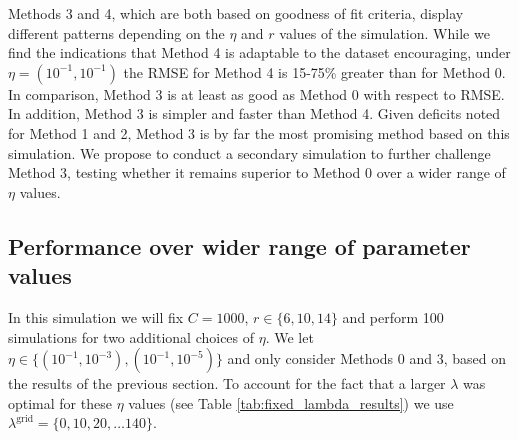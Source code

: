 \documentclass[12pt]{article}
\newcommand{\lambdagrid}{\lambda^{\text{grid}}}
\theoremstyle{break}
\theoremstyle{break}
\begin{document}
Methods 3 and 4, which are both based on goodness of fit criteria, display different patterns depending on the $\eta$ and $r$ values of the simulation.
While we find the indications that Method 4 is adaptable to the dataset encouraging, under $\eta = (10^{-1}, 10^{-1})$ the RMSE for Method 4 is 15-75\% greater than for Method 0. In comparison, Method 3 is at least as good as Method 0 with respect to RMSE. In addition,  Method 3 is simpler and faster than Method 4.  Given deficits noted for Method 1 and 2, Method 3 is by far the most promising method based on this simulation.  We propose to conduct a secondary simulation to further challenge Method 3, testing whether it remains superior to Method 0 over a wider range of $\eta$ values.




\subsection{Performance over wider range of parameter values}
\label{sec:tuning_simulation_2}


In this simulation we will fix $C = 1000$, $r \in \{6, 10, 14\}$ and perform 100 simulations for two additional choices of $\eta$.  We let $\eta \in \{ (10^{-1}, 10^{-3}), (10^{-1}, 10^{-5}) \}$ and only consider Methods 0 and 3, based on the results of the previous section.  To account for the fact that a larger $\lambda$ was optimal for these $\eta$ values (see Table \ref{tab:fixed_lambda_results}) we use $\lambdagrid = \{0,10,20, \dots 140 \}$.
\end{document}
